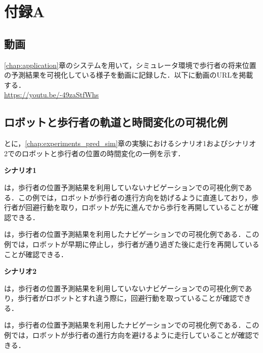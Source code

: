 \appendix
\renewcommand{\thesection}{A.\arabic{section}}
\renewcommand{\thefigure}{A.\arabic{figure}}
\chapter{付録A}
\label{chap:appendix}
\vspace{-18pt}
\section{動画}
\ref{chap:application}章のシステムを用いて，シミュレータ環境で歩行者の将来位置の予測結果を可視化している様子を動画に記録した．以下に動画のURLを掲載する．
\\
\url{https://youtu.be/-49zaStfWhs}

\section{ロボットと歩行者の軌道と時間変化の可視化例}
とに，\ref{chap:experiments_pred_sim}章の実験におけるシナリオ1およびシナリオ2でのロボットと歩行者の位置の時間変化の一例を示す．
 
\begin{flushleft}
  \textbf{シナリオ1}
\end{flushleft}

は，歩行者の位置予測結果を利用していないナビゲーションでの可視化例である．この例では，ロボットが歩行者の進行方向を妨げるように直進しており，歩行者が回避行動を取り，ロボットが先に進んでから歩行を再開していることが確認できる．

は，歩行者の位置予測結果を利用したナビゲーションでの可視化例である．この例では，ロボットが早期に停止し，歩行者が通り過ぎた後に走行を再開していることが確認できる．

\begin{flushleft}
  \textbf{シナリオ2}
\end{flushleft}

は，歩行者の位置予測結果を利用していないナビゲーションでの可視化例であり，歩行者がロボットとすれ違う際に，回避行動を取っていることが確認できる．

は，歩行者の位置予測結果を利用したナビゲーションでの可視化例である．この例では，ロボットが歩行者の進行方向を避けるように走行していることが確認できる．

